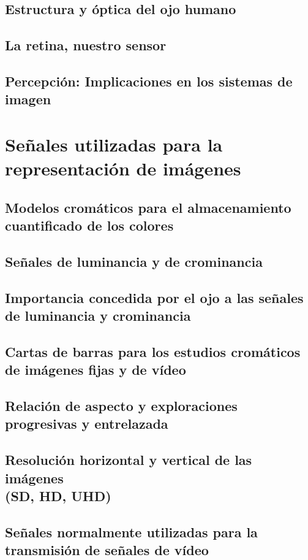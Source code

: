 \documentclass[a4paper]{book}
\begin{document}
\section{Estructura y óptica del ojo humano}
\section{La retina, nuestro sensor}
\section{Percepción: Implicaciones en los sistemas de imagen}

\chapter{Señales utilizadas para la representación de imágenes}
\section{Modelos cromáticos para el almacenamiento cuantificado de los colores}
\section{Señales de luminancia y de crominancia}
\section{Importancia concedida por el ojo a las señales de luminancia y crominancia}
\section{Cartas de barras para los estudios cromáticos de imágenes fijas y de vídeo}
\section{Relación de aspecto y exploraciones progresivas y entrelazada}
\section[Resolución horizontal y vertical de las imágenes (SD, HD, UHD)]{Resolución horizontal y vertical de las imágenes\\ (SD, HD, UHD)}
\section{Señales normalmente utilizadas para la transmisión de señales de vídeo}
\end{document}
